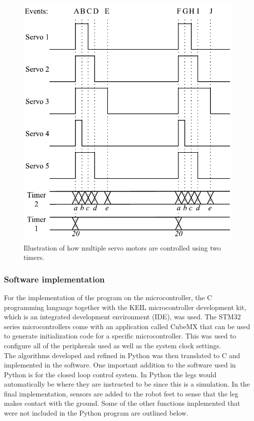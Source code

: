 \begin{figure}[H]
\centering
\includegraphics[scale = 1]{pics/Servo2.pdf}
\caption{Illustration of how multiple servo motors are controlled using two timers.}
\label{fig:Servo2}
\end{figure}

\subsubsection{Software implementation}
For the implementation of the program on the microcontroller, the C programming language together with the KEIL microcontroller development kit, which is an integrated development environment (IDE), was used. The STM32 series microcontrollers come with an application called CubeMX that can be used to generate initialization code for a specific microcontroller. This was used to configure all of the peripherals used as well as the system clock settings.\\

The algorithms developed and refined in Python was then translated to C and implemented in the software. One important addition to the software used in Python is for the closed loop control system. In Python the legs would automatically be where they are instructed to be since this is a simulation. In the final implementation, sensors are added to the robot feet to sense that the leg makes contact with the ground. Some of the other functions implemented that were not included in the Python program are outlined below.\\


